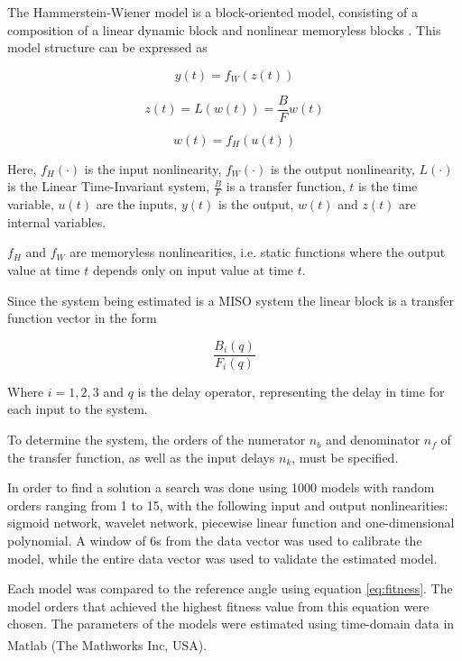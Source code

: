 \documentclass[letterpaper, 10 pt, conference]{ieeeconf}  %
\begin{document}
The Hammerstein-Wiener model is a block-oriented model, consisting of a composition of a linear dynamic block and nonlinear memoryless blocks \cite{Wills2013}. This model structure can be expressed as

\begin{equation}
\label{eq:yt}
y(t) = f_W(z(t))
\end{equation}

\begin{equation}
\label{eq:zt}
z(t) = L(w(t)) = \frac{B}{F}w(t)
\end{equation}

\begin{equation}
\label{eq:wt}
w(t) = f_H(u(t))
\end{equation}

Here, \(f_H(\cdot)\) is the input nonlinearity, \(f_W(\cdot)\) is the output nonlinearity, \(L(\cdot)\) is the Linear Time-Invariant system, \(\frac{B}{F}\) is a transfer function, \(t\) is the time variable, \(u(t)\) are the inputs, \(y(t)\) is the output, \(w(t)\) and \(z(t)\) are internal variables.

\(f_H\) and \(f_W\) are memoryless nonlinearities, i.e. static functions where the output value at time \(t\) depends only on input value at time \(t\). %

Since the system being estimated is a MISO system the linear block is a transfer function vector in the form

\begin{equation}
\label{eq:B/F}
\frac{B_i(q)}{F_i(q)}
\end{equation}

Where \(i=1,2,3\) and \(q\) is the delay operator, representing the delay in time for each input to the system.

To determine the system, the orders of the numerator \(n_b\) and denominator \(n_f\) of the transfer function, as well as the input delays \(n_k\), must be specified.

In order to find a solution a search was done using 1000 models with random orders ranging from 1 to 15, with the following input and output nonlinearities: sigmoid network, wavelet network, piecewise linear function and one-dimensional polynomial. A window of 6s from the data vector was used to calibrate the model, while the entire data vector was used to validate the estimated model.

Each model was compared to the reference angle using equation \ref{eq:fitness}. The model orders that achieved the highest fitness value from this equation were chosen. The parameters of the models were estimated using time-domain data in Matlab\textsuperscript{\textregistered} (The Mathworks Inc, USA).
\end{document}
